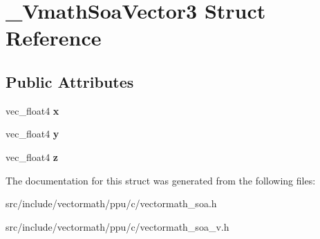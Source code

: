 \hypertarget{struct__VmathSoaVector3}{\section{\-\_\-\-Vmath\-Soa\-Vector3 Struct Reference}
\label{struct__VmathSoaVector3}
}
\subsection*{Public Attributes}
\begin{DoxyCompactItemize}
\item 
\hypertarget{struct__VmathSoaVector3_aa6ccd8f99a2972a3b313029546d3c234}{vec\-\_\-float4 {\bfseries x}}\label{struct__VmathSoaVector3_aa6ccd8f99a2972a3b313029546d3c234}

\item 
\hypertarget{struct__VmathSoaVector3_a6dd067a310742a0927056ccd34d7b611}{vec\-\_\-float4 {\bfseries y}}\label{struct__VmathSoaVector3_a6dd067a310742a0927056ccd34d7b611}

\item 
\hypertarget{struct__VmathSoaVector3_a734a2ed58c941b4ad66877a5f516a1ab}{vec\-\_\-float4 {\bfseries z}}\label{struct__VmathSoaVector3_a734a2ed58c941b4ad66877a5f516a1ab}

\end{DoxyCompactItemize}


The documentation for this struct was generated from the following files\-:\begin{DoxyCompactItemize}
\item 
src/include/vectormath/ppu/c/vectormath\-\_\-soa.\-h\item 
src/include/vectormath/ppu/c/vectormath\-\_\-soa\-\_\-v.\-h\end{DoxyCompactItemize}
